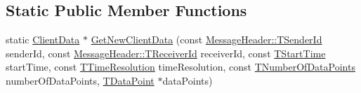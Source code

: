 \subsection*{Static Public Member Functions}
\begin{DoxyCompactItemize}
\item 
static \hyperlink{class_terra_swarm_1_1_asynchronous_1_1_client_data}{Client\-Data} $\ast$ \hyperlink{class_terra_swarm_1_1_asynchronous_1_1_client_data_abbae8a9d83addb3758fe00fbfeefae97}{Get\-New\-Client\-Data} (const \hyperlink{class_terra_swarm_1_1_message_header_a516b36855e2aad7cfbf8770f1b42784f}{Message\-Header\-::\-T\-Sender\-Id} sender\-Id, const \hyperlink{class_terra_swarm_1_1_message_header_aa3260702b182b6f88ddbdd3416e98df0}{Message\-Header\-::\-T\-Receiver\-Id} receiver\-Id, const \hyperlink{class_terra_swarm_1_1_asynchronous_1_1_client_data_a70b07646d3a13d9c2cb16ade44a49966}{T\-Start\-Time} start\-Time, const \hyperlink{class_terra_swarm_1_1_asynchronous_1_1_client_data_a626a7d114c405bceb24262253fe36c71}{T\-Time\-Resolution} time\-Resolution, const \hyperlink{class_terra_swarm_1_1_asynchronous_1_1_client_data_a690994afd0ba9b8eeb56ae679a5c64e8}{T\-Number\-Of\-Data\-Points} number\-Of\-Data\-Points, \hyperlink{class_terra_swarm_1_1_asynchronous_1_1_client_data_ac733720fed15e940f991de44f1bb514e}{T\-Data\-Point} $\ast$data\-Points)
\end{DoxyCompactItemize}
